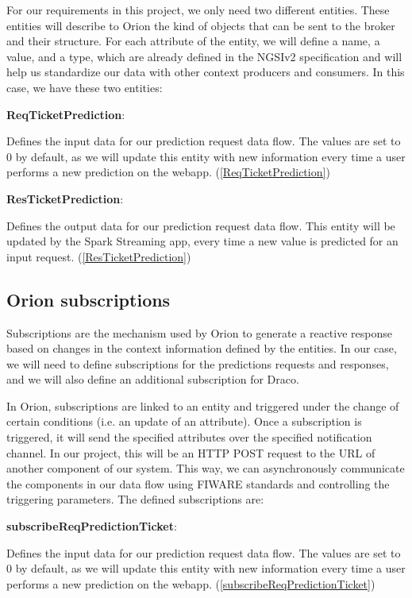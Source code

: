 For our requirements in this project, we only need two different entities. These entities will describe to Orion the kind of objects that can be sent to the broker and their structure. For each attribute of the entity, we will define a name, a value, and a type, which are already defined in the NGSIv2 specification and will help us standardize our data with other context producers and consumers. In this case, we have these two entities:

\textbf{ReqTicketPrediction}:

Defines the input data for our prediction request data flow. The values are set to 0 by default, as we will update this entity with new information every time a user performs a new prediction on the webapp. (\ref{ReqTicketPrediction})

\textbf{ResTicketPrediction}:

Defines the output data for our prediction request data flow. This entity will be updated by the Spark Streaming app, every time a new value is predicted for an input request. (\ref{ResTicketPrediction})


\subsection{Orion subscriptions}

Subscriptions are the mechanism used by Orion to generate a reactive response based on changes in the context information defined by the entities. In our case, we will need to define subscriptions for the predictions requests and responses, and we will also define an additional subscription for Draco.

In Orion, subscriptions are linked to an entity and triggered under the change of certain conditions (i.e. an update of an attribute). Once a subscription is triggered, it will send the specified attributes over the specified notification channel. In our project, this will be an HTTP POST request to the URL of another component of our system. This way, we can asynchronously communicate the components in our data flow using FIWARE standards and controlling the triggering parameters. The defined subscriptions are:

\textbf{subscribeReqPredictionTicket}:

Defines the input data for our prediction request data flow. The values are set to 0 by default, as we will update this entity with new information every time a user performs a new prediction on the webapp. (\ref{subscribeReqPredictionTicket})


